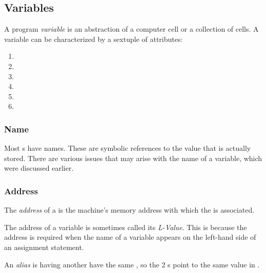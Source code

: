 \subsection{Variables}\label{subsec:Variables}
\begin{definition}[Variable]\label{def:Variable}
  A program \emph{variable} is an abstraction of a computer  cell or a collection of  cells.
  A variable can be characterized by a sextuple of attributes:
  \begin{enumerate}[noitemsep]
  \item {}
  \item {}
  \item {}
  \item {}
  \item {}
  \item {}
  \end{enumerate}
\end{definition}

\subsubsection{Name}\label{subsubsec:Variable_Name}
Most s have names.
These are symbolic references to the value that is actually stored.
There are various issues that may arise with the name of a variable, which were discussed earlier.

\subsubsection{Address}\label{subsubsec:Variable_Address}
\begin{definition}[Address]\label{def:Variable_Address}
  The \emph{address} of a  is the machine's memory address with which the  is associated.

  The address of a variable is sometimes called its \emph{L-Value}.
  This is because the address is required when the name of a variable appears on the left-hand side of an assignment statement.

  \begin{remark}[Alias]
    An \emph{alias} is having another  have the same , so the 2 s point to the same value in .
  \end{remark}
\end{definition}

